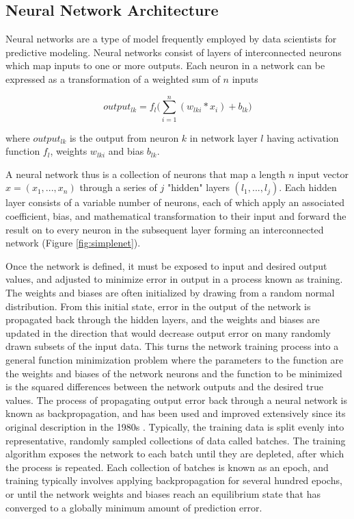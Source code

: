 \subsection*{Neural Network Architecture} \label{ssec:neuralnets}

Neural networks are a type of model frequently employed by data scientists
for predictive modeling. Neural networks consist of layers of interconnected neurons
which map inputs to one or more outputs. Each neuron in a network can be expressed as a 
transformation of a weighted sum of $n$ inputs 

\begin{equation}
    output_{lk} = f_l \bigg( \sum_{i=1}^{n} (w_{lki} * x_{i}) + b_{lk} \bigg)
\label{eq:neuron}
\end{equation}

where $output_{lk}$ is the output from neuron $k$ in network layer $l$ having activation
function $f_l$, weights $w_{lki}$ and bias $b_{lk}$.

A neural network thus is a collection of neurons that map a 
length $n$ input vector $x = (x_1, ..., x_n)$ through a series of $j$ 
"hidden" layers $(l_1, ..., l_j)$. Each hidden layer consists of a variable 
number of neurons, each of which apply an associated coefficient, bias, and 
mathematical transformation to their input and forward the 
result on to every neuron in the subsequent layer forming an interconnected
network (Figure \ref{fig:simplenet}).

\ifdefined\showtablesandfigures
\fi

Once the network is defined, it must be exposed to input and desired output
values, and adjusted to minimize error in output in a process known as training.
The weights and biases are often initialized by drawing from a
random normal distribution. From this initial state, error in 
the output of the network is propagated back through the hidden 
layers, and the weights and biases are updated in the direction that would 
decrease output error on many randomly drawn subsets of the input data. 
This turns the network training process into a general 
function minimization problem where the parameters to the function are the 
weights and biases of the network neurons and the function to be 
minimized is the squared differences between the network outputs and 
the desired true values. The process of propagating output error back 
through a neural network is known as backpropagation, and has been used 
and improved extensively since its original description in the 
1980s \citep{rumelhart1986}.  Typically, the training data is split 
evenly into representative, randomly sampled collections of data 
called batches. The training algorithm exposes the network to each 
batch until they are depleted, after which the process is repeated. Each 
collection of batches is known as an epoch, and training typically
involves applying backpropagation for several hundred epochs, or until the network
weights and biases reach an equilibrium state that has converged to a 
globally minimum amount of prediction error.

